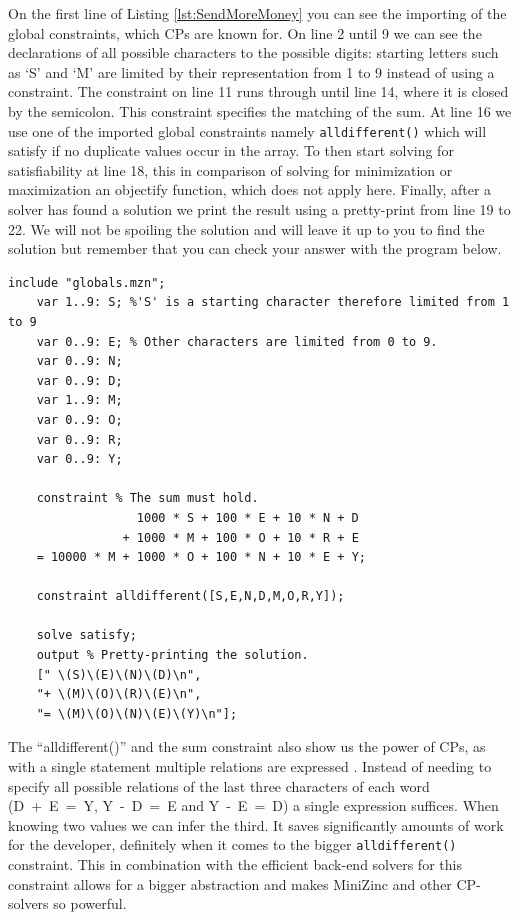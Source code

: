 \label{sendMoreMoneyExplanation}
On the first line of Listing \ref{lst:SendMoreMoney} you can see the importing of the global constraints, which CPs are known for. On line 2 until 9 we can see the declarations of all possible characters to the possible digits: starting letters such as ‘S’ and ‘M’ are limited by their representation from 1 to 9 instead of using a constraint. The constraint on line 11 runs through until line 14, where it is closed by the semicolon. This constraint specifies the matching of the sum. At line 16 we use one of the imported global constraints namely \texttt{alldifferent()} which will satisfy if no duplicate values occur in the array. To then start solving for satisfiability at line 18, this in comparison of solving for minimization or maximization an objectify function, which does not apply here. Finally, after a solver has found a solution we print the result using a pretty-print from line 19 to 22.
We will not be spoiling the solution and will leave it up to you to find the solution but remember that you can check your answer with the program below.

\begin{minipage}{0.948\textwidth}
\begin{lstlisting}[language=minizinc, label={lst:SendMoreMoney}, caption={Solution to the puzzle “send more money” modified and taken from \url{https://www.minizinc.org/doc-2.5.5/en/downloads/send-more-money.mzn}.}]
	include "globals.mzn";
	var 1..9: S; %'S' is a starting character therefore limited from 1 to 9
	var 0..9: E; % Other characters are limited from 0 to 9.
	var 0..9: N;
	var 0..9: D;
	var 1..9: M;
	var 0..9: O;
	var 0..9: R;
	var 0..9: Y;
	
	constraint % The sum must hold.
                  1000 * S + 100 * E + 10 * N + D
                + 1000 * M + 100 * O + 10 * R + E
    = 10000 * M + 1000 * O + 100 * N + 10 * E + Y;
	
	constraint alldifferent([S,E,N,D,M,O,R,Y]);
	
	solve satisfy;
	output % Pretty-printing the solution.
	[" \(S)\(E)\(N)\(D)\n",
	"+ \(M)\(O)\(R)\(E)\n",
	"= \(M)\(O)\(N)\(E)\(Y)\n"];
\end{lstlisting}
\end{minipage}


The “alldifferent()” and the sum constraint also show us the power of CPs, as with a single statement multiple relations are expressed \cite{53marriott1998programming}. Instead of needing to specify all possible relations of the last three characters of each word (\mbox{D + E = Y}, \mbox{Y - D = E} and \mbox{Y - E = D}) a single expression suffices. When knowing two values we can infer the third. It saves significantly amounts of work for the developer, definitely when it comes to the bigger \texttt{alldifferent()} constraint. This in combination with the efficient back-end solvers for this constraint allows for a bigger abstraction and makes MiniZinc and other CP-solvers so powerful.

